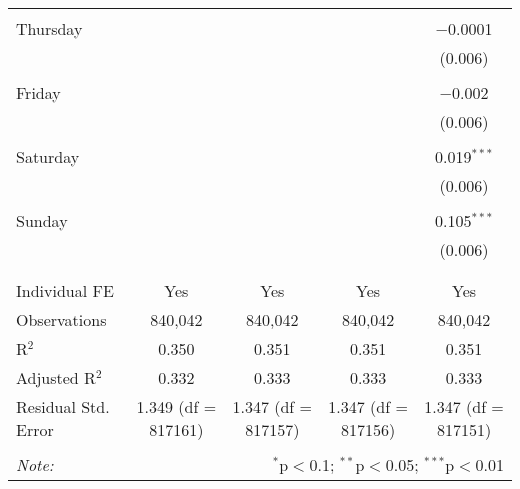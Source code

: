 \documentclass[
]{article}
\begin{document}
\begin{table}[!htbp]
{\begin{tabular}{@{\extracolsep{5pt}}lcccc}
  & & & & \\ 
 Thursday &  &  &  & $-$0.0001 \\ 
  &  &  &  & (0.006) \\ 
  & & & & \\ 
 Friday &  &  &  & $-$0.002 \\ 
  &  &  &  & (0.006) \\ 
  & & & & \\ 
 Saturday &  &  &  & 0.019$^{***}$ \\ 
  &  &  &  & (0.006) \\ 
  & & & & \\ 
 Sunday &  &  &  & 0.105$^{***}$ \\ 
  &  &  &  & (0.006) \\ 
  & & & & \\ 
\hline \\[-1.8ex] 
Individual FE & Yes & Yes & Yes & Yes \\ 
Observations & 840,042 & 840,042 & 840,042 & 840,042 \\ 
R$^{2}$ & 0.350 & 0.351 & 0.351 & 0.351 \\ 
Adjusted R$^{2}$ & 0.332 & 0.333 & 0.333 & 0.333 \\ 
Residual Std. Error & 1.349 (df = 817161) & 1.347 (df = 817157) & 1.347 (df = 817156) & 1.347 (df = 817151) \\ 
\hline 
\hline \\[-1.8ex] 
\textit{Note:}  & \multicolumn{4}{r}{$^{*}$p$<$0.1; $^{**}$p$<$0.05; $^{***}$p$<$0.01} \\ 
\end{tabular}
} 
\end{table} 
\newpage
\end{document}
